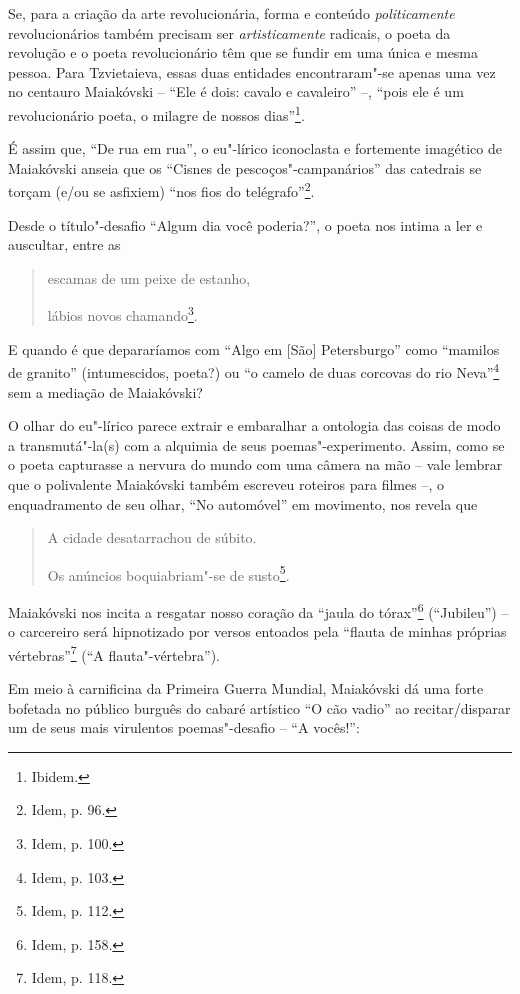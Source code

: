 Se, para a criação da arte revolucionária, forma e conteúdo
\emph{politicamente} revolucionários também precisam ser
\emph{artisticamente} radicais, o poeta da revolução e o poeta
revolucionário têm que se fundir em uma única e mesma pessoa. Para
Tzvietaieva, essas duas entidades encontraram"-se apenas uma vez no
centauro Maiakóvski -- ``Ele é dois: cavalo e cavaleiro'' --, ``pois ele
é um revolucionário poeta, o milagre de nossos dias''\footnote{Ibidem.}.

É assim que, ``De rua em rua'', o eu"-lírico iconoclasta e fortemente
imagético de Maiakóvski anseia que os ``Cisnes de pescoços"-campanários''
das catedrais se torçam (e/ou se asfixiem) ``nos fios do
telégrafo''\footnote{Idem, p. 96.}.

Desde o título"-desafio ``Algum dia você poderia?'', o poeta nos intima a
ler e auscultar, entre as

\begin{quote}
escamas de um peixe de estanho,

lábios novos chamando\footnote{Idem, p. 100.}.
\end{quote}

E quando é que depararíamos com ``Algo em {[}São{]} Petersburgo'' como
``mamilos de granito'' (intumescidos, poeta?) ou ``o camelo de duas
corcovas do rio Neva''\footnote{Idem, p. 103.} sem a mediação de
Maiakóvski?

O olhar do eu"-lírico parece extrair e embaralhar a ontologia das coisas
de modo a transmutá"-la(s) com a alquimia de seus poemas"-experimento.
Assim, como se o poeta capturasse a nervura do mundo com uma câmera na
mão -- vale lembrar que o polivalente Maiakóvski também escreveu
roteiros para filmes --, o enquadramento de seu olhar, ``No automóvel''
em movimento, nos revela que

\begin{quote}
A cidade desatarrachou de súbito.

Os anúncios boquiabriam"-se de susto\footnote{Idem, p. 112.}.
\end{quote}

Maiakóvski nos incita a resgatar nosso coração da ``jaula do
tórax''\footnote{Idem, p. 158.} (``Jubileu'') -- o carcereiro será
hipnotizado por versos entoados pela ``flauta de minhas próprias
vértebras''\footnote{Idem, p. 118.} (``A flauta"-vértebra'').

Em meio à carnificina da Primeira Guerra Mundial, Maiakóvski dá uma
forte bofetada no público burguês do cabaré artístico ``O cão vadio'' ao
recitar/disparar um de seus mais virulentos poemas"-desafio -- ``A
vocês!'':

